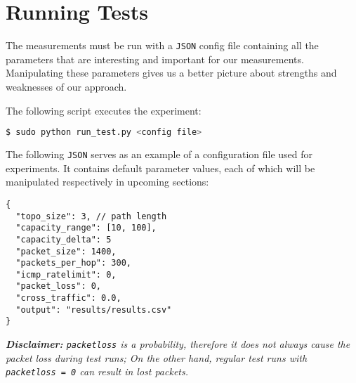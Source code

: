 \section{Running Tests}
The measurements must be run with a \texttt{JSON} config file containing all the parameters that are interesting and important for our measurements. Manipulating these parameters gives us a better picture about strengths and weaknesses of our approach.

The following script executes the experiment:
\begin{lstlisting}[language=bash]
  $ sudo python run_test.py <config file>
\end{lstlisting}

The following \texttt{JSON} serves as an example of a configuration file used for experiments.
It contains default parameter values, each of which will be manipulated respectively in upcoming sections:
\begin{lstlisting}
{    
  "topo_size": 3, // path length
  "capacity_range": [10, 100],			
  "capacity_delta": 5
  "packet_size": 1400,
  "packets_per_hop": 300,
  "icmp_ratelimit": 0,
  "packet_loss": 0,
  "cross_traffic": 0.0,
  "output": "results/results.csv"
}
\end{lstlisting}

\textit{\textbf{Disclaimer:} \texttt{packet\textunderscore loss} is a probability, therefore it does not always cause the packet loss during test runs; On the other hand, regular test runs with \texttt{packet\textunderscore loss = 0} can result in lost packets.}
